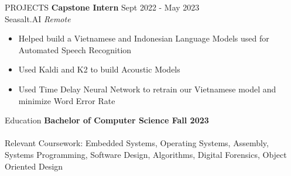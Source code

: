 \documentclass{resume} %
\begin{document}
	\begin{rSection}{PROJECTS}
		\textbf{Capstone Intern} \hfill Sept 2022 - May 2023\\
		Seasalt.AI \hfill \textit{Remote}
		\begin{itemize} \itemsep -5pt {} 
			\item Helped build a Vietnamese and Indonesian Language Models used for Automated Speech Recognition
			\item Used Kaldi and K2 to build Acoustic Models
			\item Used Time Delay Neural Network to retrain our Vietnamese model and minimize Word Error Rate
		\end{itemize}
\begin{comment}
		\textbf{Using SPI with GPIO Expander:} Working with a Raspberry Pi Nano and a GPIO expander, I wrote C code to communicate between the two devices using bit-banging. Device specifics can be found in my GitHub repository. You can see the code and project report write up \href{https://github.com/gloghry/CS466_sub/tree/working/lab4}{here}.
\end{comment}
	\end{rSection} 


	\begin{rSection}{Education}
		{\bf Bachelor of Computer Science \hfill {Fall 2023}}\\
		\\
		Relevant Coursework: Embedded Systems, Operating Systems, Assembly, Systems Programming, Software Design, Algorithms, Digital Forensics, Object Oriented Design
	\end{rSection}

	\vfill
	\begin{center}
	\end{center}
\end{document}
